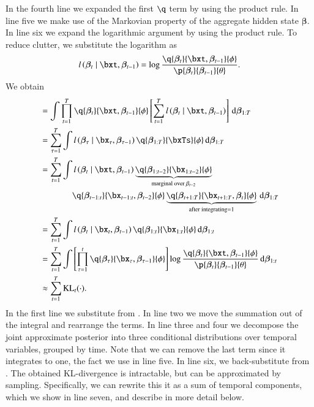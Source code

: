 In the fourth line we expanded the first $\q$ term by using the product rule. In line five we make use of the Markovian property of the aggregate hidden state $\bm{\beta}$. In line six we expand the logarithmic argument by using the product rule. To reduce clutter, we substitute the logarithm as
\begin{equation}
    l \left( \bm{\beta}_t \mid \bxt, \bm{\beta}_{t-1} \right)
     =
    \log{\frac{ 
        \q{\bm{\beta}_t}{\bxt, \bm{\beta}_{t-1}}{\phi} 
    }{ 
        \p{\bm{\beta}_t}{\bm{\beta}_{t-1} }{\theta}
    }}.
\label{eq:log_subst}
\end{equation}
We obtain
\begin{equation}
\begin{aligned}   
    &= \int \prod_{t=1}^T \q{\bm{\beta}_t}{\bxt, \bm{\beta}_{t-1}}{\phi} \left[ \sum_{t=1}^{T} l \left( \bm{\beta}_t \mid \bxt, \bm{\beta}_{t-1} \right) \right]  \dint \bm{\beta}_{1:T}\\
%    
    &= \sum_{\tau=1}^T \int l \left( \bm{\beta}_\tau \mid \bx_\tau, \bm{\beta}_{\tau-1} \right) \q{\bm{\beta}_{1:T}}{\bxTs}{\phi}    \dint \bm{\beta}_{1:T}\\
%    
    &= 
    \sum_{t=1}^T 
    \int 
    l \left( \bm{\beta}_t \mid \bxt, \bm{\beta}_{t-1} \right) 
    \underbrace{\q{\bm{\beta}_{1:t-2}}{\bx_{1:t-2}}{\phi}}_
    {\text{marginal over } \beta_{t-2}}\\
%    
    &\qquad \quad \ \ \ \q{\bm{\beta}_{t-1:t}}{\bx_{t-1:t}, \bm{\beta}_{t-2}}{\phi}
    \underbrace{\q{\bm{\beta}_{t+1:T}}{\bx_{t+1:T}, \bm{\beta}_{t}}{\phi}}_
    {\text{after integrating} = 1}
    \dint 
    \bm{\beta}_{1:T}\\
%    
    &= 
    \sum_{t=1}^T 
    \int 
    l \left( \bm{\beta}_t \mid \bx_t, \bm{\beta}_{t-1} \right) 
    \q{\bm{\beta}_{1:t}}{\bx_{1:t}}{\phi} 
    \dint 
    \bm{\beta}_{1:t}\\
    &= 
    \sum_{t=1}^T 
    \int 
    \left[ \prod_{\tau=1}^t \q{\bm{\beta}_\tau}{\bx_\tau, \bm{\beta}_{\tau-1}}{\phi} \right]
    \log{\frac{ \q{\bm{\beta}_t}{\bxt, \bm{\beta}_{t-1}}{\phi} }{ \p{\bm{\beta}_t}{\bm{\beta}_{t-1} }{\theta}}}
    \dint 
    \bm{\beta}_{1:t}\\
%    
    &\approx \sum_{t=1}^T \operatorname{KL}_t(\cdot).
\end{aligned}
\label{eq:apdr_kl_2}
\end{equation}
In the first line we substitute from . In line two we move the summation out of the integral and rearrange the terms. In line three and four we decompose the joint approximate posterior into three conditional distributions over temporal variables, grouped by time. Note that we can remove the last term since it integrates to one, the fact we use in line five. In line six, we back-substitute from . The obtained KL-divergence is intractable, but can be approximated by sampling. Specifically, we can rewrite this it as a sum of temporal components, which we show in line seven, and describe in more detail below.
